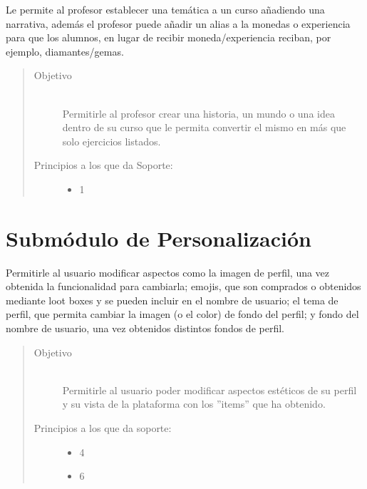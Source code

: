     Le permite al profesor establecer una temática a un curso añadiendo una narrativa, además el profesor puede añadir un alias a la monedas o experiencia para que los alumnos, en lugar de recibir moneda/experiencia reciban, por ejemplo, diamantes/gemas.
    
    \begin{quote}
    \begin{description}
    \item[Objetivo] \hfill\\
        Permitirle al profesor crear una historia, un mundo o una idea dentro de su curso que le permita convertir el mismo en más que solo ejercicios listados.
    
    \item[Principios a los que da Soporte:] \hfill
        \begin{itemize}
            \item 1 \principioI{}
        \end{itemize}
    \end{description}    
    \end{quote}
    
    

\section{Submódulo de Personalización}

    Permitirle al usuario modificar aspectos como la imagen de perfil, una vez obtenida la funcionalidad para cambiarla; emojis, que son comprados o obtenidos mediante loot boxes y se pueden incluir en el nombre de usuario; el tema de perfil, que permita cambiar la imagen (o el color) de fondo del perfil; y fondo del nombre de usuario, una vez obtenidos distintos fondos de perfil.
    
    
    \begin{quote}
    \begin{description}    
    \item[Objetivo] \hfill\\
        Permitirle al usuario poder modificar aspectos estéticos de su perfil y su vista de la plataforma con los ''items'' que ha obtenido.
    
    \item[Principios a los que da soporte:] \hfill
        \begin{itemize}
            \item 4 \principioIV
            \item 6 \principioVI
        \end{itemize}
    \end{description}    
    \end{quote}

\clearpage